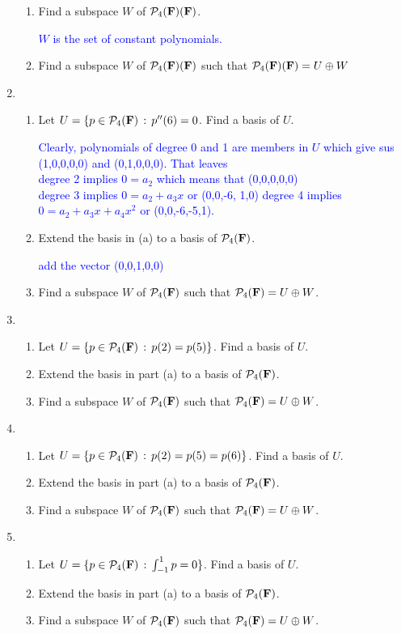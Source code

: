 \documentclass[10pt,a4paper]{report}
\newcommand{\BLUE}[1]{\textcolor{blue}{#1}}
\newcommand{\F}{\textbf{F}}
\begin{document}
\begin{enumerate}
\begin{enumerate}
	\item Find a subspace $W$ of $\PP{4}(\F)$.
	
	\BLUE{$W$ is the set of constant polynomials.
	}
	
	\item Find a subspace $W$ of $\PP{4}(\F)$ such that $\PP{4}(\F)=U\oplus W$
\end{enumerate}

\item \begin{enumerate}
	\item Let $U=\{p\in\PP{4}\,:\,p''(6)=0$.  Find a basis of $U$.
	
	\BLUE{Clearly, polynomials of degree 0 and 1 are members in $U$ which give sus (1,0,0,0,0) and (0,1,0,0,0).  That leaves \\
	degree 2 implies $0=a_2$ which means that (0,0,0,0,0) \\
	degree 3 implies $0=a_2+a_3x$ or (0,0,-6, 1,0)
	degree 4 implies $0=a_2+a_3x+a_4x^2$ or (0,0,-6,-5,1).
	}
	
	\item Extend the basis in (a) to a basis of $\PP{4}$.
	
	\BLUE{add the vector (0,0,1,0,0)}

	\item Find a subspace $W$ of $\PP{4}$ such that $\PP{4}=U\oplus W$.
\end{enumerate}

\item \begin{enumerate}
	\item Let $U=\{p\in \PP{4}\,:\,p(2)=p(5)\}$.  Find a basis of $U$.
	\item Extend the basis in part (a) to a basis of $\PP{4}$.
	\item Find a subspace $W$ of $\PP{4}$ such that $\PP{4}=U\oplus W$.
\end{enumerate}

\item \begin{enumerate}
	\item Let $U=\{p\in \PP{4}\,:\,p(2)=p(5)=p(6)\}$.  Find a basis of $U$.
	\item Extend the basis in part (a) to a basis of $\PP{4}$.
	\item Find a subspace $W$ of $\PP{4}$ such that $\PP{4}=U\oplus W$.
\end{enumerate}
\item \begin{enumerate}
	\item Let $U=\{p\in \PP{4}\,:\,\int_{-1}^1 p=0\}$.  Find a basis of $U$.
	\item Extend the basis in part (a) to a basis of $\PP{4}$.
	\item Find a subspace $W$ of $\PP{4}$ such that $\PP{4}=U\oplus W$.
\end{enumerate}


\end{enumerate}
\end{document}
